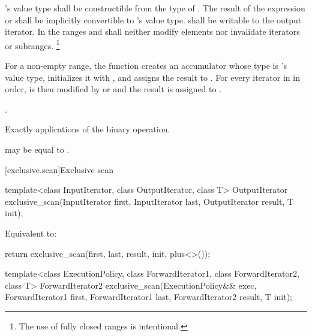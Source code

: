 \begin{itemdescr}
\pnum
\requires
{}'s value type shall be constructible
from the type of .
The result of the
expression  or 
shall be implicitly convertible to 's value type.
 shall be writable to
the  output iterator.
In the ranges  and 
 shall neither modify elements
nor invalidate iterators or subranges.%
\footnote{The use of fully closed ranges is intentional.}

\pnum
\effects
For a non-empty range,
the function creates an accumulator 
whose type is 's value type,
initializes it with ,
and assigns the result to .
For every iterator  in  in order,
 is then modified by
 or 
and the result is assigned to .

\pnum
\returns
{}.

\pnum
\complexity
Exactly  applications of the binary operation.

\pnum
\remarks
{} may be equal to .
\end{itemdescr}

[exclusive.scan]{Exclusive scan}

%
\begin{itemdecl}
template<class InputIterator, class OutputIterator, class T>
  OutputIterator exclusive_scan(InputIterator first, InputIterator last,
                                OutputIterator result, T init);
\end{itemdecl}

\begin{itemdescr}
\pnum
\effects
Equivalent to:
\begin{codeblock}
return exclusive_scan(first, last, result, init, plus<>());
\end{codeblock}
\end{itemdescr}

%
\begin{itemdecl}
template<class ExecutionPolicy, class ForwardIterator1, class ForwardIterator2, class T>
  ForwardIterator2 exclusive_scan(ExecutionPolicy&& exec,
                                  ForwardIterator1 first, ForwardIterator1 last,
                                  ForwardIterator2 result, T init);
\end{itemdecl}

